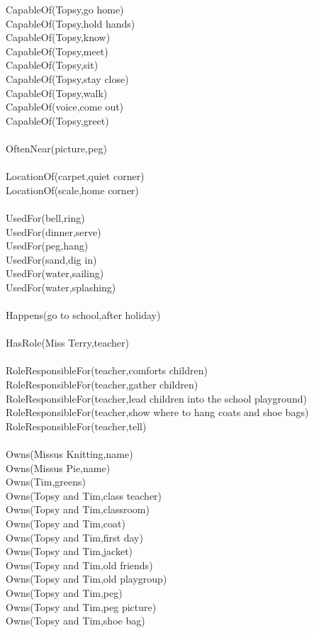 \begin{multicols}{2}
\begin{footnotesize}
CapableOf(Topsy,go home) \\
CapableOf(Topsy,hold hands) \\
CapableOf(Topsy,know) \\
CapableOf(Topsy,meet) \\
CapableOf(Topsy,sit) \\
CapableOf(Topsy,stay close) \\
CapableOf(Topsy,walk) \\
CapableOf(voice,come out) \\
CapableOf(Topsy,greet) \\
~\\
OftenNear(picture,peg) \\
~\\
LocationOf(carpet,quiet corner) \\
LocationOf(scale,home corner) \\
~\\
UsedFor(bell,ring) \\
UsedFor(dinner,serve) \\
UsedFor(peg,hang) \\
UsedFor(sand,dig in) \\
UsedFor(water,sailing) \\
UsedFor(water,splashing) \\
~\\
Happens(go to school,after holiday) \\
~\\
HasRole(Miss Terry,teacher) \\
~\\
RoleResponsibleFor(teacher,comforts children) \\
RoleResponsibleFor(teacher,gather children) \\
RoleResponsibleFor(teacher,lead children into the school playground) \\
RoleResponsibleFor(teacher,show where to hang coats and shoe bags) \\
RoleResponsibleFor(teacher,tell) \\
~\\
Owns(Missus Knitting,name) \\
Owns(Missus Pie,name) \\
Owns(Tim,greens) \\
Owns(Topsy and Tim,class teacher) \\
Owns(Topsy and Tim,classroom) \\
Owns(Topsy and Tim,coat) \\
Owns(Topsy and Tim,first day) \\
Owns(Topsy and Tim,jacket) \\
Owns(Topsy and Tim,old friends) \\
Owns(Topsy and Tim,old playgroup) \\
Owns(Topsy and Tim,peg) \\
Owns(Topsy and Tim,peg picture) \\
Owns(Topsy and Tim,shoe bag) \\
\end{footnotesize}
\end{multicols}

